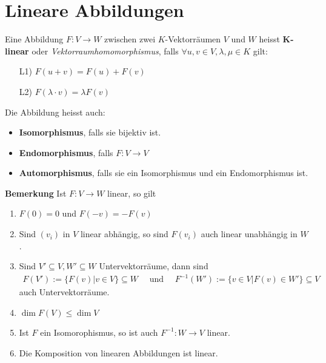 \section{Lineare Abbildungen}
\begin{mdframed}
Eine Abbildung $F: V \rightarrow W$ zwischen zwei $K$-Vektorräumen $V$ und $W$ heisst $\mathbf{K}$\textbf{-linear} oder \emph{Vektorraumhomomorphismus}, falls $\forall u, v \in V, \lambda, \mu \in K$ gilt:
\begin{itemize}
    \item[L1)] $F(u + v) = F(u) + F(v)$
    \item[L2)] $F(\lambda \cdot v) = \lambda F(v)$
\end{itemize}
Die Abbildung heisst auch:
\begin{itemize}
    \item \textbf{Isomorphismus}, falls sie bijektiv ist.
    
    \item \textbf{Endomorphismus}, falls $F: V \rightarrow V$ 
    
    \item \textbf{Automorphismus}, falls sie ein Isomorphismus und ein Endomorphismus ist.
\end{itemize}
\end{mdframed}
\newpage
\textbf{Bemerkung} Ist $F: V \rightarrow W$ linear, so gilt
\begin{enumerate}[{(}a{)}]
    \item $F(0) = 0$ und $F(-v) = -F(v)$ 
    
    \item Sind $(v_i)$ in $V$ linear abhängig, so sind $F(v_i)$ auch linear unabhängig in $W$.
    
    \item Sind $V' \subseteq V, W' \subseteq W$ Untervektorräume, dann sind
    \begin{align*}
        F(V') := \{F(v)\big\vert v \in V\} \subseteq W \quad \text{ und }  \quad F^{-1}(W') := \{v \in V \big\vert F(v) \in W'\} \subseteq V
    \end{align*}
    auch Untervektorräume.

    \item $\dim F(V) \leq \dim V$
    
    \item Ist $F$ ein Isomorophismus, so ist auch $F^{-1}: W \rightarrow V$ linear.
    
    \item Die Komposition von linearen Abbildungen ist linear.
\end{enumerate}
